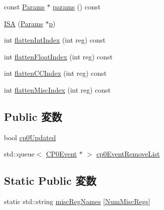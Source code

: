\begin{DoxyCompactItemize}
\item 
const \hyperlink{classMipsISA_1_1ISA_a356644158667486a7a343f11512e4dc7}{Params} $\ast$ \hyperlink{classMipsISA_1_1ISA_acd3c3feb78ae7a8f88fe0f110a718dff}{params} () const 
\item 
\hyperlink{classMipsISA_1_1ISA_ae9132e021b3f3b20c917fc328a056bbd}{ISA} (\hyperlink{classMipsISA_1_1ISA_a356644158667486a7a343f11512e4dc7}{Params} $\ast$\hyperlink{namespaceMipsISA_a37d3f683959086eac7bcf24a002a9fb8}{p})
\item 
int \hyperlink{classMipsISA_1_1ISA_aece4b88ffcab608652e8e9f0fbe643d4}{flattenIntIndex} (int reg) const 
\item 
int \hyperlink{classMipsISA_1_1ISA_a85addcd4f57c5a0ffa81805dcad1eeb7}{flattenFloatIndex} (int reg) const 
\item 
int \hyperlink{classMipsISA_1_1ISA_a7a5d7476bd10e5af09e6e753d1fca087}{flattenCCIndex} (int reg) const 
\item 
int \hyperlink{classMipsISA_1_1ISA_a8997760aa4425793911f57440a4dd8ae}{flattenMiscIndex} (int reg) const 
\end{DoxyCompactItemize}
\subsection*{Public 変数}
\begin{DoxyCompactItemize}
\item 
bool \hyperlink{classMipsISA_1_1ISA_a92cda46eabfff2a3514c1c2721e25990}{cp0Updated}
\item 
std::queue$<$ \hyperlink{classMipsISA_1_1ISA_1_1CP0Event}{CP0Event} $\ast$ $>$ \hyperlink{classMipsISA_1_1ISA_a8adab10ee83d624a89033e9d1979662e}{cp0EventRemoveList}
\end{DoxyCompactItemize}
\subsection*{Static Public 変数}
\begin{DoxyCompactItemize}
\item 
static std::string \hyperlink{classMipsISA_1_1ISA_a9cdc253c8b6e87a237586ded36ac309f}{miscRegNames} \mbox{[}\hyperlink{namespaceMipsISA_a568d4aa96dd7cd963f3b1b1b0446c9c6}{NumMiscRegs}\mbox{]}
\end{DoxyCompactItemize}
